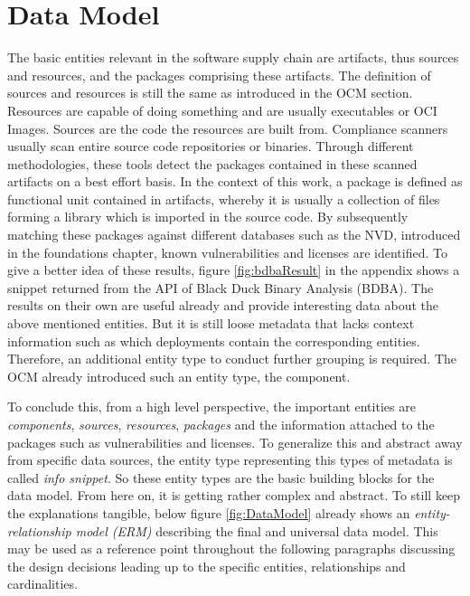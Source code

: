 \section{Data Model}
The basic entities relevant in the software supply chain are artifacts, thus sources and resources, and the packages comprising these artifacts. The definition of sources and resources is still the same as introduced in the OCM section. Resources are capable of doing something and are usually executables or OCI Images. Sources are the code the resources are built from. Compliance scanners usually scan entire source code repositories or binaries. Through different methodologies, these tools detect the packages contained in these scanned artifacts on a best effort basis. In the context of this work, a package is defined as functional unit contained in artifacts, whereby it is usually a collection of files forming a library which is imported in the source code. By subsequently matching these packages against different databases such as the NVD, introduced in the foundations chapter, known vulnerabilities and licenses are identified. To give a better idea of these results, figure \ref{fig:bdbaResult} in the appendix shows a snippet returned from the API of Black Duck Binary Analysis (BDBA). The results on their own are useful already and provide interesting data about the above mentioned entities. But it is still loose metadata that lacks context information such as which deployments contain the corresponding entities. Therefore, an additional entity type to conduct further grouping is required. The OCM already introduced such an entity type, the component.\par
To conclude this, from a high level perspective, the important entities are \emph{components}, \emph{sources}, \emph{resources}, \emph{packages} and the information attached to the packages such as vulnerabilities and licenses. To generalize this and abstract away from specific data sources, the entity type representing this types of metadata is called \emph{info snippet}. So these entity types are the basic building blocks for the data model. From here on, it is getting rather complex and abstract. To still keep the explanations tangible, below figure \ref{fig:DataModel} already shows an \emph{entity-relationship model (ERM)} describing the final and universal data model. This may be used as a reference point throughout the following paragraphs discussing the design decisions leading up to the specific entities, relationships and cardinalities.

